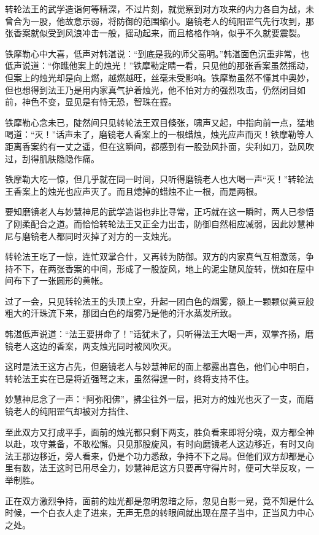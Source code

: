 \documentclass[12pt,oneside]{book}
\begin{document}
转轮法王的武学造诣何等精深，不过片刻，就觉察到对方攻来的内力各自为战，未曾合为一股，他故意示弱，将防御的范围缩小。磨镜老人的纯阳罡气先行攻到，那张香案就似受到风浪冲击一般，摇动起来，而且格格作响，似乎不久就要震裂。

铁摩勒心中大喜，低声对韩湛说：``到底是我的师父高明。''韩湛面色沉重非常，也低声说道：``你瞧他案上的烛光！''铁摩勒定睛一看，只见他的那张香案虽然摇动，但案上的烛光却是向上燃，越燃越旺，丝毫未受影响。铁摩勒虽然不懂其中奥妙，但也想得到法王乃是用内家真气护着烛光，他不怕对方的强烈攻击，仍然闭目如前，神色不变，显见是有恃无恐，智珠在握。

铁摩勒心念未已，陡然间只见转轮法王双目倏张，啸声又起，中指向前一点，猛地喝道：``灭！''话声未了，磨镜老人香案上的一根蜡烛，烛光应声而灭！铁摩勒等人距离香案约有一丈之遥，但在这瞬间，都感到有一股劲风扑面，尖利如刀，劲风吹过，刮得肌肤隐隐作痛。

铁摩勒大吃一惊，但几乎就在同一时间，只听得磨镜老人也大喝一声``灭！''转轮法王香案上的烛光也应声灭了。而且熄掉的蜡烛不止一根，而是两根。

要知磨镜老人与妙慧神尼的武学造诣也非比寻常，正巧就在这一瞬时，两人已参悟了刚柔配合之道。而恰恰转轮法王又正全力出击，防御自然相应减弱，因此妙慧神尼与磨镜老人都同时灭掉了对方的一支烛光。

转轮法王吃了一惊，连忙双掌合什，又再转为防御。双方的内家真气互相激荡，争持不下，在两张香案的中间，形成了一股旋风，地上的泥尘随风旋转，恍如在屋中间布下了一张圆形的黄帐。

过了一会，只见转轮法王的头顶上空，升起一团白色的烟雾，额上一颗颗似黄豆般粗大的汗珠流下来，那团白色的烟雾乃是他的汗水蒸发所致。

韩湛低声说道：``法王要拼命了！''话犹未了，只听得法王大喝一声，双掌齐扬，磨镜老人这边的香案，两支烛光同时被风吹灭。

这时是法王这方占先，但磨镜老人与妙慧神尼的面上都露出喜色，他们心中明白，转轮法王实在已是将近强弩之末，虽然得逞一时，终将支持不住。

妙慧神尼念了一声：``阿弥阳佛''，拂尘往外一层，把对方的烛光也灭了一支，而磨镜老人的纯阳罡气却被对方挡住、

至此双方又打成平手，面前的烛光都只剩下两支，胜负看来即将分晓，双方都全神以赴，攻守兼备，不敢松懈。只见那股旋风，有时向磨镜老人这边移近，有时又向法王那边移近，旁人看来，仍是个功力悉敌，争持不下之局。但他们双方却都是心里有数，法王这时已用尽全力，妙慧神尼这方只要再守得片时，便可大举反攻，一举制胜。

正在双方激烈争持，面前的烛光都是忽明忽暗之际，忽见白影一晃，竟不知是什么时候，一个白衣人走了进来，无声无息的转眼间就出现在屋子当中，正当风力中心之处。
\end{document}

